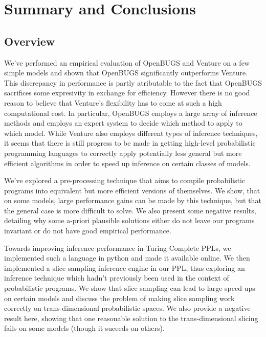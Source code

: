 \chapter{Summary and Conclusions}
\label{chap:conc}

\section{Overview}
We've performed an empirical evaluation of OpenBUGS and Venture on a few simple models and shown that OpenBUGS significantly outperforms Venture. This discrepancy in performance is partly atributable to the fact that OpenBUGS sacrifices some expresivity in exchange for efficiency. However there is no good reason to believe that Venture's flexibility has to come at such a high computational cost. In particular, OpenBUGS employs a large array of inference methods and employs an expert system to decide which method to apply to which model. While Venture also employs different types of inference techniques, it seems that there is still progress to be made in getting high-level probabilistic programming languages to correctly apply potentially less general but more efficient algorithms in order to speed up inference on certain classes of models.

We've explored a pre-processing technique that aims to compile probabilistic programs into equivalent but more efficient versions of themselves. We show, that on some models, large performance gains can be made by this technique, but that the general case is more difficult to solve. We also present some negative results, detailing why some a-priori plausible solutions either do not leave our programs invariant or do not have good empirical performance.

Towards improving inference performance in Turing Complete PPLs, we implemented such a language in python and made it available online. We then implemented a slice sampling inference engine in our PPL, thus exploring an inference technique which hadn't previously been used in the context of probabilistic programs. We show that slice sampling can lead to large speed-ups on certain models and discuss the problem of making slice sampling work correctly on trans-dimensional probabilistic spaces. We also provide a negative result here, showing that one reasonable solution to the trans-dimensional slicing fails on some models (though it suceeds on others).

